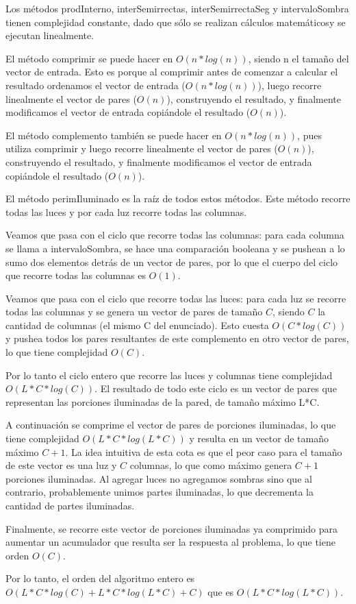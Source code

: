 Los métodos prodInterno, interSemirrectas, interSemirrectaSeg y intervaloSombra tienen complejidad
constante, dado que sólo se realizan cálculos matemáticosy se ejecutan linealmente.

El método comprimir se puede hacer en $O(n*log(n))$, siendo n el tamaño del vector de entrada. Esto
es porque al comprimir antes de comenzar a calcular el resultado ordenamos el vector de entrada
($O(n*log(n))$), luego recorre linealmente el vector de pares ($O(n)$), construyendo el resultado,
y finalmente modificamos el vector de entrada copiándole el resultado ($O(n)$).

El método complemento también se puede hacer en $O(n*log(n))$, pues utiliza comprimir y luego recorre
linealmente el vector de pares ($O(n)$), construyendo el resultado, y finalmente modificamos el vector
de entrada copiándole el resultado ($O(n)$).

El método perimIluminado es la raíz de todos estos métodos. Este método recorre todas las luces y
por cada luz recorre todas las columnas.

Veamos que pasa con el ciclo que recorre todas las columnas: para cada columna se llama a
intervaloSombra, se hace una comparación booleana y se pushean a lo sumo dos elementos detrás de un
vector de pares, por lo que el cuerpo del ciclo que recorre todas las columnas es $O(1)$.

Veamos que pasa con el ciclo que recorre todas las luces: para cada luz se recorre todas las columnas
y se genera un vector de pares de tamaño $C$, siendo $C$ la cantidad de columnas (el mismo C del
enunciado). Esto cuesta $O(C*log(C))$ y pushea todos los pares resultantes de este complemento en otro
vector de pares, lo que tiene complejidad $O(C)$.

Por lo tanto el ciclo entero que recorre las luces y columnas tiene complejidad $O(L*C*log(C))$. El
resultado de todo este ciclo es un vector de pares que representan las porciones iluminadas de la pared,
de tamaño máximo L*C.

A continuación se comprime el vector de pares de porciones iluminadas, lo que tiene complejidad
$O(L*C*log(L*C))$ y resulta en un vector de tamaño máximo $C+1$. La idea intuitiva de esta cota es que
el peor caso para el tamaño de este vector es una luz y $C$ columnas, lo que como máximo genera $C+1$
porciones iluminadas. Al agregar luces no agregamos sombras sino que al contrario, probablemente unimos
partes iluminadas, lo que decrementa la cantidad de partes iluminadas.

Finalmente, se recorre este vector de porciones iluminadas ya comprimido para aumentar un acumulador que
resulta ser la respuesta al problema, lo que tiene orden $O(C)$.

Por lo tanto, el orden del algoritmo entero es $O(L*C*log(C) + L*C*log(L*C) + C)$ que es $O(L*C*log(L*C))$.
